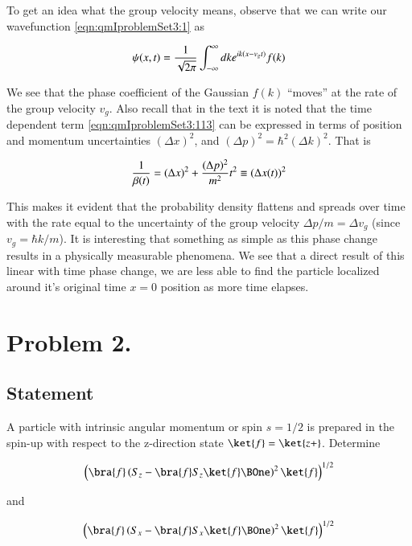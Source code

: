To get an idea what the group velocity means, observe that we can write our wavefunction \ref{eqn:qmIproblemSet3:1} as

\begin{align}\label{eqn:qmIproblemSet3:140}
\psi(x,t) = \frac{1}{\sqrt{2\pi}} \int_{-\infty}^\infty dk e^{i k (x - v_g t)} f(k)
\end{align}

We see that the phase coefficient of the Gaussian $f(k)$ ``moves'' at the rate of the group velocity $v_g$.  Also recall that in the text it is noted that the time dependent term \ref{eqn:qmIproblemSet3:113} can be expressed in terms of position and momentum uncertainties $(\Delta x)^2$, and $(\Delta p)^2 = \hbar^2 (\Delta k)^2$.  That is

\begin{align}\label{eqn:qmIproblemSet3:116}
\frac{1}{\beta(t)} = (\Delta x)^2 + \frac{(\Delta p)^2}{m^2} t^2 \equiv (\Delta x(t))^2
\end{align}

This makes it evident that the probability density flattens and spreads over time with the rate equal to the uncertainty of the group velocity $\Delta p/m = \Delta v_g$ (since $v_g = \hbar k/m$).  It is interesting that something as simple as this phase change results in a physically measurable phenomena.  We see that a direct result of this linear with time phase change, we are less able to find the particle localized around it's original time $x = 0$ position as more time elapses.

\section{Problem 2.}

\subsection{Statement}
A particle with intrinsic angular momentum or spin $s=1/2$ is prepared in the spin-up with respect to the z-direction state $\ket{f}=\ket{z+}$. Determine

\begin{align}\label{eqn:qmIproblemSet3:3}
\left(\bra{f} \left( S_z - \bra{f} S_z \ket{f} \BOne \right)^2 \ket{f} \right)^{1/2}
\end{align}

and 

\begin{align}\label{eqn:qmIproblemSet3:4}
\left(\bra{f} \left( S_x - \bra{f} S_x \ket{f} \BOne \right)^2 \ket{f} \right)^{1/2}
\end{align}

